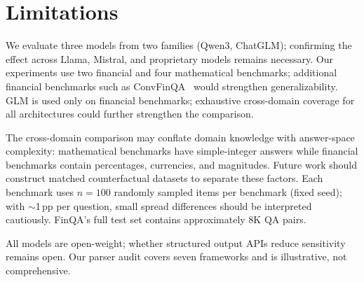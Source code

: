 \section{Limitations}
\label{sec:limitations}

We evaluate three models from two families (Qwen3, ChatGLM); confirming the effect across Llama, Mistral, and proprietary models remains necessary. Our experiments use two financial and four mathematical benchmarks; additional financial benchmarks such as ConvFinQA~\cite{chen2022convfinqa} would strengthen generalizability. GLM is used only on financial benchmarks; exhaustive cross-domain coverage for all architectures could further strengthen the comparison.

The cross-domain comparison may conflate domain knowledge with answer-space complexity: mathematical benchmarks have simple-integer answers while financial benchmarks contain percentages, currencies, and magnitudes. Future work should construct matched counterfactual datasets to separate these factors. Each benchmark uses $n=100$ randomly sampled items per benchmark (fixed seed); with $\sim$1\,pp per question, small spread differences should be interpreted cautiously. FinQA's full test set contains approximately 8K QA pairs.

All models are open-weight; whether structured output APIs reduce sensitivity remains open. Our parser audit covers seven frameworks and is illustrative, not comprehensive.
